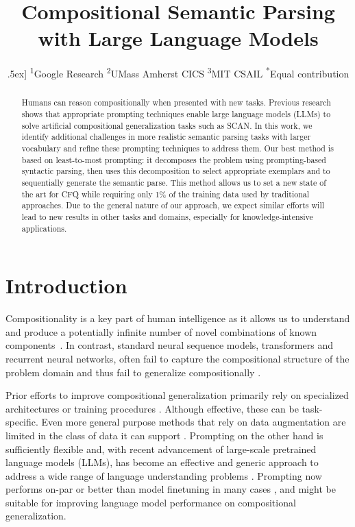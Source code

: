 \documentclass{article} \usepackage{iclr2022_conference,times}
\title{Compositional Semantic Parsing with Large Language Models}
\author{\0.5ex]
\textsuperscript{1}Google Research
\quad \textsuperscript{2}UMass Amherst CICS
\quad \textsuperscript{3}MIT CSAIL
\quad \textsuperscript{*}Equal contribution
\vspace{-3ex}}
\begin{document}
\doparttoc \faketableofcontents 

\maketitle

\thispagestyle{firstpage}

\begin{abstract}
Humans can reason compositionally when presented with new tasks.  Previous research shows that appropriate prompting techniques enable large language models (LLMs) to solve artificial compositional generalization tasks such as SCAN. In this work, we identify additional challenges in more realistic semantic parsing tasks with larger vocabulary and refine these prompting techniques to address them. Our best method is based on least-to-most prompting: it decomposes the problem using prompting-based syntactic parsing, then uses this decomposition to select appropriate exemplars and to sequentially generate the semantic parse. This method allows us to set a new state of the art for CFQ while requiring only 1\% of the training data used by traditional approaches. Due to the general nature of our approach, we expect similar efforts will lead to new results in other tasks and domains, especially for knowledge-intensive applications.
\end{abstract}



\section{Introduction}

Compositionality is a key part of human intelligence as it allows us to understand and produce a potentially infinite number of novel combinations of known components~\citep{chomsky1957syntax,Montague1970grammar,lake2017buildingmachines}. In contrast, standard neural sequence models, transformers and recurrent neural networks, often fail to capture the compositional
structure of the problem domain and thus fail to generalize compositionally
\citep{Keysers2020MeasuringCG,Furrer2020CompositionalGI}.

Prior efforts to improve compositional generalization primarily rely on specialized architectures or training procedures \citep{lake2019compositional,xinyun2020neuralsymbolic,nye2020learning,andreas-2020-good,conklin-etal-2021-meta,ekina2021recombine,liu-etal-2021-learning-algebraic}. Although effective, these can be task-specific. Even more general purpose methods that rely on data augmentation are limited in the class of data it can support \citep{shaw2020compositional,qiu-etal-2022-improving}.
Prompting on the other hand is sufficiently flexible and, with recent advancement of large-scale pretrained language models (LLMs), has become an effective and generic approach to address a wide range of language understanding problems \citep{gpt3}. Prompting now performs on-par or better than model finetuning in many cases \citep{Wei2022ChainOT,palm2022,wei2022emergent,kojima2022large,palm2022saycan}, and might be suitable for improving language model performance on compositional generalization.
\end{document}

